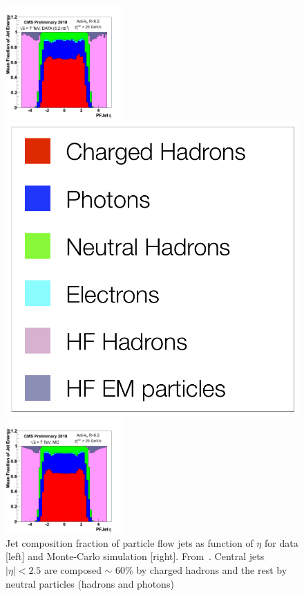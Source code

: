  \begin{figure}[!Hhtbp]
  \begin{center}
    \includegraphics[width=0.4\textwidth]{figs/Jet_composition_data_7TeV.png}
    \begin{minipage}[t]{.15\textwidth}
      \centering
      \includegraphics[width=1.0\textwidth]{figs/Legend_jet_composition.png}
    \end{minipage}
    \includegraphics[width=0.4\textwidth]{figs/Jet_composition_MC_7TeV.png}
    \caption{Jet composition fraction of particle flow jets as function of $\eta$ for data [left] and Monte-Carlo simulation [right]. From~\cite{Beaudette:2014cea}. Central jets $|\eta|<2.5$ are composed $\sim$ 60\% by charged hadrons and the rest by neutral particles (hadrons and photons) }
    \label{fig:PFJets}
  \end{center}
\end{figure}

